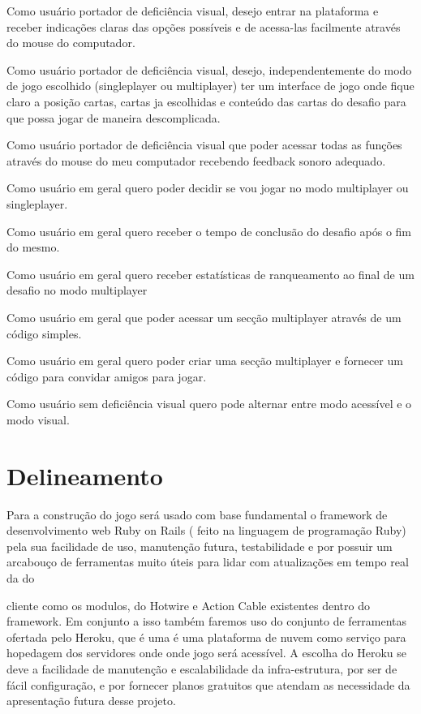 \begin{alineascomnumero}
    \item Como usuário portador de deficiência visual, desejo entrar na plataforma e receber indicações claras das opções possíveis e de acessa-las facilmente através do mouse do computador.
    \item Como usuário portador de deficiência visual, desejo, independentemente do modo de jogo escolhido (singleplayer ou multiplayer) ter um interface de jogo onde fique claro a posição cartas, cartas ja escolhidas e conteúdo das cartas do desafio para que possa jogar de maneira descomplicada.
    \item Como usuário portador de deficiência visual que poder acessar todas as funções através do mouse do meu computador recebendo feedback sonoro adequado.
    \item Como usuário em geral quero poder decidir se vou jogar no modo multiplayer ou singleplayer.
    \item Como usuário em geral quero receber o tempo de conclusão do desafio após o fim do mesmo.
    \item Como usuário em geral quero receber estatísticas de ranqueamento ao final de um desafio no modo multiplayer
    \item Como usuário em geral que poder acessar um secção multiplayer através de um código simples.
    \item Como usuário em geral quero poder criar uma secção multiplayer e fornecer um código para convidar amigos para jogar.
    \item Como usuário sem deficiência visual quero pode alternar entre modo acessível e o modo visual.
\end{alineascomnumero}


\section{Delineamento}
Para a construção do jogo será usado com base fundamental o framework de desenvolvimento web Ruby on Rails ( feito na linguagem de programação Ruby) pela sua facilidade de uso, manutenção futura, testabilidade e por possuir um arcabouço de ferramentas muito úteis para lidar com atualizações em tempo real da do 

cliente como os modulos, do Hotwire e Action Cable existentes dentro do framework. 
Em conjunto a isso também faremos uso do conjunto de ferramentas ofertada pelo Heroku, que é uma é uma plataforma de nuvem como serviço para hopedagem dos servidores onde onde jogo será acessível. A escolha do Heroku se deve a facilidade de manutenção e escalabilidade da infra-estrutura, por ser de fácil configuração, e por fornecer planos gratuitos que atendam as necessidade da apresentação futura desse projeto.

